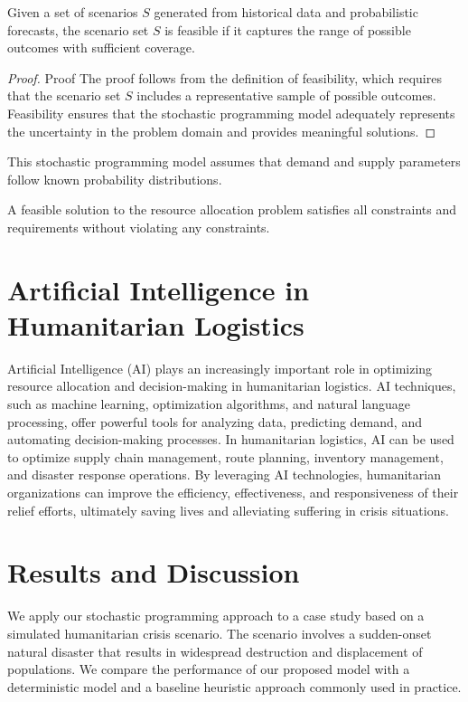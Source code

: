 \documentclass[trsc,dblanonrev]{informs4}
\begin{document}
\begin{lemma}\label{lem:FSS}
Given a set of scenarios $S$ generated from historical data and probabilistic forecasts, the scenario set $S$ is feasible if it captures the range of possible outcomes with sufficient coverage.
\end{lemma}

\begin{proof}{Proof}
The proof follows from the definition of feasibility, which requires that the scenario set $S$ includes a representative sample of possible outcomes. Feasibility ensures that the stochastic programming model adequately represents the uncertainty in the problem domain and provides meaningful solutions.\Halmos
\end{proof}

\begin{remark}
This stochastic programming model assumes that demand and supply parameters follow known probability distributions.
\end{remark}

\begin{definition}
A feasible solution to the resource allocation problem satisfies all constraints and requirements without violating any constraints.
\end{definition}

\section{Artificial Intelligence in Humanitarian Logistics}\label{sec:AI}
Artificial Intelligence (AI) plays an increasingly important role in optimizing resource allocation and decision-making in humanitarian logistics. AI techniques, such as machine learning, optimization algorithms, and natural language processing, offer powerful tools for analyzing data, predicting demand, and automating decision-making processes. In humanitarian logistics, AI can be used to optimize supply chain management, route planning, inventory management, and disaster response operations. By leveraging AI technologies, humanitarian organizations can improve the efficiency, effectiveness, and responsiveness of their relief efforts, ultimately saving lives and alleviating suffering in crisis situations.

\section{Results and Discussion}\label{sec:Results}
We apply our stochastic programming approach to a case study based on a simulated humanitarian crisis scenario. The scenario involves a sudden-onset natural disaster that results in widespread destruction and displacement of populations. We compare the performance of our proposed model with a deterministic model and a baseline heuristic approach commonly used in practice.
\end{document}
